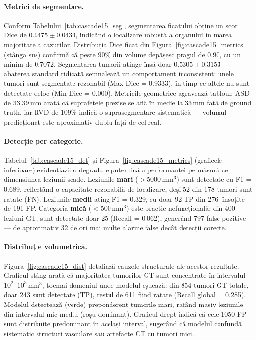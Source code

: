 \documentclass[12pt, a4paper]{report}
\begin{document}
  \paragraph{Metrici de segmentare.}
Conform Tabelului~\ref{tab:cascade15_seg}, segmentarea ficatului obține un scor Dice de $0.9475 \pm 0.0436$, indicând o localizare robustă a organului în marea majoritate a cazurilor. Distribuția Dice ficat din Figura~\ref{fig:cascade15_metrics} (stânga sus) confirmă că peste 90\% din volume depășesc pragul de 0.90, cu un minim de 0.7072. Segmentarea tumorii atinge însă doar $0.5305 \pm 0.3153$ — abaterea standard ridicată semnalează un comportament inconsistent: unele tumori sunt segmentate rezonabil (Max Dice = 0.9333), în timp ce altele nu sunt detectate deloc (Min Dice = 0.000). Metricile geometrice agravează tabloul: ASD de 33.39\,mm arată că suprafețele prezise se află în medie la 33\,mm față de ground truth, iar RVD de 109\% indică o suprasegmentare sistematică — volumul predicționat este aproximativ dublu față de cel real.

\paragraph{Detecție per categorie.}
Tabelul~\ref{tab:cascade15_det} și Figura~\ref{fig:cascade15_metrics} (graficele inferioare) evidențiază o degradare puternică a performanței pe măsură ce dimensiunea leziunii scade. Leziunile \textbf{mari} ($>$5000\,mm$^3$) sunt detectate cu F1 = 0.689, reflectând o capacitate rezonabilă de localizare, deși 52 din 178 tumori sunt ratate (FN). Leziunile \textbf{medii} ating F1 = 0.329, cu doar 92 TP din 276, însoțite de 191 FP. Categoria \textbf{mică} ($<$500\,mm$^3$) este practic nefuncțională: din 400 leziuni GT, sunt detectate doar 25 (Recall = 0.062), generând 797 false pozitive — de aproximativ 32 de ori mai multe alarme false decât detecții corecte.

\paragraph{Distribuție volumetrică.}
Figura~\ref{fig:cascade15_dist} detaliază cauzele structurale ale acestor rezultate. Graficul stâng arată că majoritatea tumorilor GT sunt concentrate în intervalul $10^2$–$10^3$\,mm$^3$, tocmai domeniul unde modelul eșuează: din 854 tumori GT totale, doar 243 sunt detectate (TP), restul de 611 fiind ratate (Recall global = 0.285). Modelul detectează (verde) preponderent tumorile mari, ratând masiv leziunile din intervalul mic-mediu (roșu dominant). Graficul drept indică că cele 1050 FP sunt distribuite predominant în același interval, sugerând că modelul confundă sistematic structuri vasculare sau artefacte CT cu tumori mici.
\end{document}
